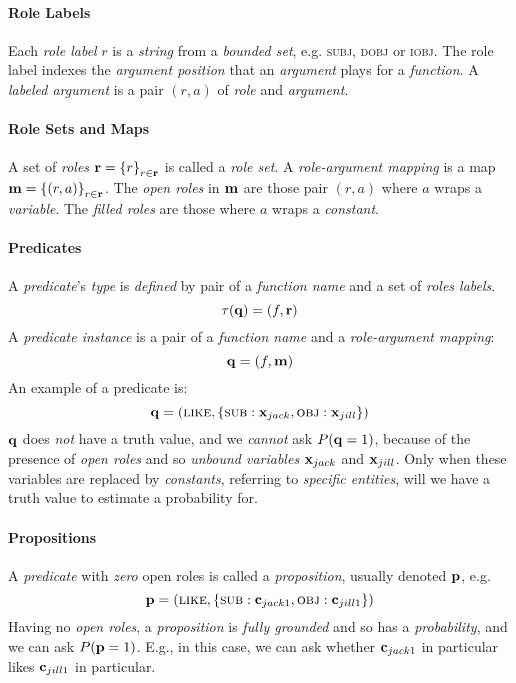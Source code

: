 \documentclass[11pt]{article}
\newcommand{\constant}[1]{{\bf c}_{#1}}
\newcommand{\variable}[1]{{\bf x}_{#1}}
\newcommand{\rvariable}{{\bf r}}
\newcommand{\pvariable}{{\bf p}}
\newcommand{\qvariable}{{\bf q}}
\newcommand{\mvariable}{{\bf m}}
\begin{document}
\paragraph{Role Labels}
Each {\em role label} $r$ is a {\em string} from a {\em bounded set}, e.g. \textsc{subj}, \textsc{dobj} or \textsc{iobj}.
The role label indexes the {\em argument position} that an {\em argument} plays for a {\em function}.
A {\em labeled argument} is a pair $(r, a)$ of {\em role} and {\em argument}.

\paragraph{Role Sets and Maps}
A set of {\em roles} $\rvariable = \left\{r\right\}_{r \in \rvariable}$ is called a {\em role set}.
A {\em role-argument mapping} is a map $\mvariable = \left\{(r, a)\right\}_{r \in \rvariable}$.
The {\em open roles} in $\mvariable$ are those pair $(r, a)$ where $a$ wraps a {\em variable}.
The {\em filled roles} are those where $a$ wraps a {\em constant}.

\paragraph{Predicates}
A {\em predicate}'s {\em type} is {\em defined} by pair of a {\em function name} and a set of {\em roles labels}.
\begin{equation} \tau(\qvariable) = (f, \rvariable)\end{equation}
A {\em predicate instance} is a pair of a {\em function name} and a {\em role-argument mapping}:
\begin{equation} \qvariable = (f, \mvariable)\end{equation}
An example of a predicate is:
\begin{equation} \qvariable = (\textsc{like}, \left\{\textsc{sub}: \variable{jack}, \textsc{obj}: \variable{jill} \right\})\end{equation}
$\qvariable$ does {\em not} have a truth value, and we {\em cannot} ask $P(\qvariable = 1)$, because of the presence of {\em open roles} and so {\em unbound variables} $\variable{jack}$ and $\variable{jill}$.
Only when these variables are replaced by {\em constants}, referring to {\em specific entities}, will we have a truth value to estimate a probability for.

\paragraph{Propositions}
A {\em predicate} with {\em zero} open roles is called a {\em proposition}, usually denoted $\pvariable$, e.g.
\begin{equation} \pvariable = (\textsc{like}, \left\{\textsc{sub}: \constant{jack1}, \textsc{obj}: \constant{jill1} \right\})\end{equation}
Having no {\em open roles}, a {\em proposition} is {\em fully grounded} and so has a {\em probability}, and we can ask $P(\pvariable = 1)$.
E.g., in this case, we can ask whether $\constant{jack1}$ in particular likes $\constant{jill1}$ in particular.
\end{document}
